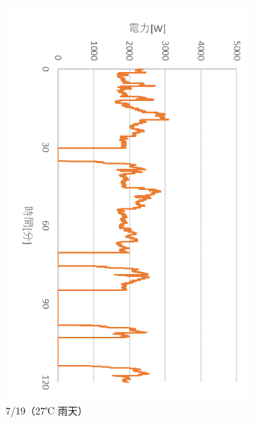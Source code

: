 \documentclass[a4j,fleqn,dvipdfmx,uplatex]{jsarticle}
\begin{document}
\begin{figure}[htb]
\begin{subfigure}[b]{0.42\linewidth}
    \includegraphics[width=\linewidth]{img/0719_power.png}
    \caption{7/19（27℃ 雨天）}
  \end{subfigure}
  \begin{subfigure}[b]{0.42\linewidth}
    \centering

\end{subfigure}
\end{figure}
\end{document}

